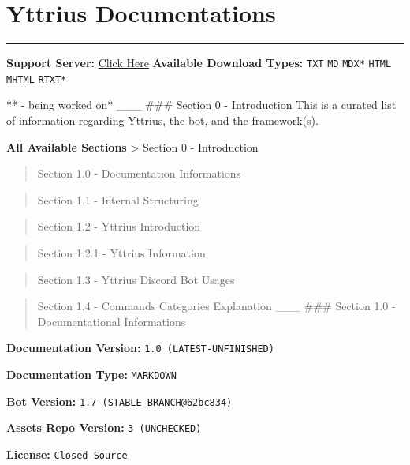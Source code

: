 \hypertarget{yttrius-documentations}{%
\section{Yttrius Documentations}\label{yttrius-documentations}}

\begin{center}\rule{0.5\linewidth}{0.5pt}\end{center}

\textbf{Support Server:} \href{https://discord.gg/PbJQRT9zQ8}{Click
Here} \textbf{Available Download Types:} \texttt{TXT} \texttt{MD}
\texttt{MDX*} \texttt{HTML} \texttt{MHTML} \texttt{RTXT*}

** - being worked on* \_\_\_ \#\#\# Section 0 - Introduction This is a
curated list of information regarding Yttrius, the bot, and the
framework(s).

\textbf{All Available Sections} \textgreater{} Section 0 - Introduction

\begin{quote}
Section 1.0 - Documentation Informations
\end{quote}

\begin{quote}
Section 1.1 - Internal Structuring
\end{quote}

\begin{quote}
Section 1.2 - Yttrius Introduction
\end{quote}

\begin{quote}
Section 1.2.1 - Yttrius Information
\end{quote}

\begin{quote}
Section 1.3 - Yttrius Discord Bot Usages
\end{quote}

\begin{quote}
Section 1.4 - Commands Categories Explanation \_\_\_ \#\#\# Section 1.0
- Documentational Informations
\end{quote}

\textbf{Documentation Version:} \texttt{1.0\ (LATEST-UNFINISHED)}

\textbf{Documentation Type:} \texttt{MARKDOWN}

\textbf{Bot Version:} \texttt{1.7\ (STABLE-BRANCH@62bc834)}

\textbf{Assets Repo Version:} \texttt{3\ (UNCHECKED)}

\textbf{License:} \texttt{Closed\ Source}

